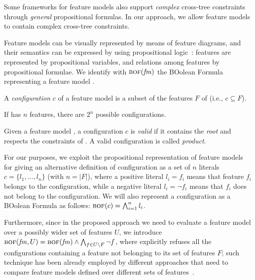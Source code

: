 \begin{tikzborder}{\cite{Gargantini16:validation}}
\begin{tikzborder}{\cite{gargantini_combinatorial_2017}}
\begin{tikzborder}{\cite{gargantini_combinatorial_2017}}
\begin{tikzborder}{\cite{garn2019}}
\begin{tikzborder}{\cite{arcaini2019achieving}}
	Some frameworks for feature models also support {\it complex} cross-tree constraints \cite{knuppel_is_2017} through \textit{general} propositional formulas. In our approach, we allow feature models to contain complex cross-tree constraints.
	
	Feature models can be visually represented by means of feature diagrams, and their semantics can be expressed by using propositional logic~\cite{batory2005feature,benavides2010automated}: features are represented by propositional variables, and relations among features by propositional formulae. We identify with $\textsc{bof}(\mathit{fm})$ the \textsc{BO}olean \textsc{F}ormula representing a feature model \fm.
	
	\begin{mydef}\label{def:configuration1}
		A \emph{configuration} $c$ of a feature model \fm is a subset of the features $F$ of \fm (i.e., $c \subseteq F$).
	\end{mydef}
	
	If \fm has $n$ features, there are $2^n$ possible configurations.
	
	\begin{mydef}\label{def:validity}
		Given a feature model \fm, a configuration $c$ is \emph{valid} if it contains the \emph{root} and respects the constraints of \fm. A valid configuration is called \emph{product}.
	\end{mydef}
	
	For our purposes, we exploit the propositional representation of feature models for giving an alternative definition of configuration as a set of $n$ literals $c = \{l_1, \ldots, l_n\}$ (with $n = |F|$), where a positive literal $l_i=f_i$ means that feature $f_i$ belongs to the configuration, while a negative literal $l_i=\neg f_i$ means that $f_i$ does not belong to the configuration. We will also represent a configuration as a BOolean Formula as follows: $\textsc{bof}(c) = \bigwedge_{i=1}^n l_i$.
	
	Furthermore, since in the proposed approach we need to evaluate a feature model over a possibly wider set of features $U$, we introduce $\textsc{bof}(\mathit{fm}, U) = \textsc{bof}(\mathit{fm}) \wedge \bigwedge_{f \in U \setminus F} \neg f$, where \fm explicitly refuses all the configurations containing a feature not belonging to its set of features $F$; such technique has been already employed by different approaches that need to compare feature models defined over different sets of features~\cite{thum_reasoning_2009,icst2015}.
	\be
	

\end{tikzborder}
\end{tikzborder}
\end{tikzborder}
\end{tikzborder}
\end{tikzborder}

